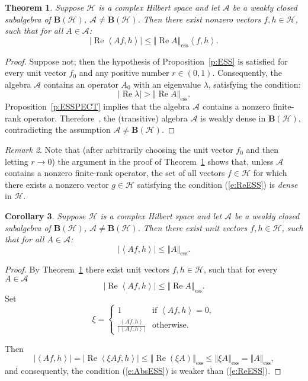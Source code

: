\documentclass{tran-l}
\newtheorem{thm}{Theorem}[subsection]
\newtheorem{cor}[thm]{Corollary}
\theoremstyle{definition}
\theoremstyle{remark}
\newtheorem{rem}[thm]{Remark}
\numberwithin{equation}{subsection}
\DeclareMathOperator{\RE}{Re}
\DeclareMathOperator{\ess}{ess}
\newcommand{\To}{\longrightarrow}
\newcommand{\h}{\mathcal{H}}
\newcommand{\A}{\mathcal{A}}
\newcommand{\BH}{\mathbf{B}(\mathcal{H})}
\newcommand{\abs}[1]{\left\vert#1\right\vert}
\newcommand{\seq}[1]{\left<#1\right>}
\newcommand{\norm}[1]{\left\Vert#1\right\Vert}
\newcommand{\essnorm}[1]{\norm{#1}_{\ess}}
\begin{document}
\begin{thm}\label{t:UNIFBURN}
Suppose $\h$ is a complex Hilbert space and let $\A$ be a weakly closed subalgebra of $\BH$, $\A\neq\BH$. Then there exist nonzero vectors $f,h\in\h$, such that for all $A\in\A$:
\begin{equation}\label{e:ReESS}
  \abs{\RE\seq{A f,h}}\leq\essnorm{\RE A}\seq{f,h}.
\end{equation}
\end{thm}

\begin{proof}
Suppose not; then the hypothesis of Proposition~\ref{p:ESS} is satisfied for every unit vector $f_0$ and any positive number $r\in(0,1)$. Consequently, the algebra $\A$ contains an operator $A_0$ with an eigenvalue $\lambda$, satisfying the condition:
\[ \abs{\RE\lambda}>\essnorm{\RE{A}}. \]
Proposition~\ref{p:ESSPECT} implies that the algebra $\A$ contains a nonzero finite-rank operator. Therefore~\cite[Theorem~8.2]{RR73}, the (transitive) algebra $\A$ is weakly dense in $\BH$, contradicting the assumption $\A\neq\BH$.
\end{proof}

\begin{rem}
Note that (after arbitrarily choosing the unit vector $f_0$ and then letting $r\To0$) the argument in the proof of Theorem~\ref{t:UNIFBURN} shows that, unless $\A$ contains a nonzero finite-rank operator, the set of all vectors $f\in\h$ for which there exists a nonzero vector $g\in\h$ satisfying the condition (\ref{e:ReESS}) is \emph{dense} in $\h$.
\end{rem}

\begin{cor}\label{c:UNIFBURN}
Suppose $\h$ is a complex Hilbert space and let $\A$ be a weakly closed subalgebra of $\BH$, $\A\neq\BH$. Then there exist \emph{unit} vectors $f,h\in\h$, such that for all $A\in\A$:
\begin{equation}\label{e:AbsESS}
  \abs{\seq{A f,h}}\leq\essnorm{A}.
\end{equation}
\end{cor}

\begin{proof}
By Theorem~\ref{t:UNIFBURN} there exist unit vectors $f,h\in\h$, such that for every $A\in\A$
\[ \abs{\RE{\seq{A f,h}}}\leq\essnorm{\RE{A}}. \]
Set
\[ \xi =\left\lbrace
  \begin{array}{cl}
    1 & \text{if $\seq{A{f},h}=0$},\\
    \tfrac{\seq{A{f},h}}{\abs{\seq{A{f},h}}} & \text{otherwise}.
  \end{array} \right. \]

Then
\[ \abs{\seq{A f,h}} = \abs{\RE\seq{\xi A f,h}}
   \leq \essnorm{\RE(\xi A)}
   \leq \essnorm{\xi A}
      = \essnorm{A}, \]
and consequently, the condition (\ref{e:AbsESS}) is weaker than (\ref{e:ReESS}).
\end{proof}
\end{document}
